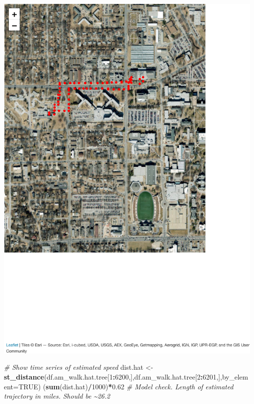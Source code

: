 \documentclass[
]{book}
\newenvironment{Shaded}{\begin{snugshade}}{\end{snugshade}}
\newcommand{\AttributeTok}[1]{\textcolor[rgb]{0.13,0.29,0.53}{#1}}
\newcommand{\CommentTok}[1]{\textcolor[rgb]{0.56,0.35,0.01}{\textit{#1}}}
\newcommand{\ConstantTok}[1]{\textcolor[rgb]{0.56,0.35,0.01}{#1}}
\newcommand{\DecValTok}[1]{\textcolor[rgb]{0.00,0.00,0.81}{#1}}
\newcommand{\FloatTok}[1]{\textcolor[rgb]{0.00,0.00,0.81}{#1}}
\newcommand{\FunctionTok}[1]{\textcolor[rgb]{0.13,0.29,0.53}{\textbf{#1}}}
\newcommand{\NormalTok}[1]{#1}
\newcommand{\OtherTok}[1]{\textcolor[rgb]{0.56,0.35,0.01}{#1}}
\newcommand{\SpecialCharTok}[1]{\textcolor[rgb]{0.81,0.36,0.00}{\textbf{#1}}}
\begin{document}
\includegraphics{_main_files/figure-latex/unnamed-chunk-9-1.pdf}

\begin{Shaded}
\begin{Highlighting}[]
\CommentTok{\# Show time series of estimated speed}
\NormalTok{dist.hat }\OtherTok{\textless{}{-}} \FunctionTok{st\_distance}\NormalTok{(df.am\_walk.hat.tree[}\DecValTok{1}\SpecialCharTok{:}\DecValTok{6200}\NormalTok{,],df.am\_walk.hat.tree[}\DecValTok{2}\SpecialCharTok{:}\DecValTok{6201}\NormalTok{,],}\AttributeTok{by\_element=}\ConstantTok{TRUE}\NormalTok{)}
\NormalTok{(}\FunctionTok{sum}\NormalTok{(dist.hat)}\SpecialCharTok{/}\DecValTok{1000}\NormalTok{)}\SpecialCharTok{*}\FloatTok{0.62} \CommentTok{\# Model check. Length of estimated trajectory in miles. Should be \textasciitilde{}26.2}
\end{Highlighting}
\end{Shaded}
\end{document}
